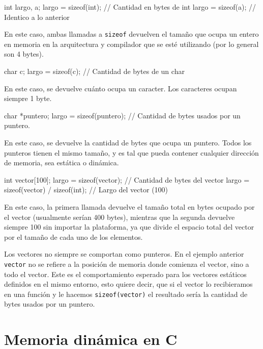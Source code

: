 \begin{codigo-c-plano}
 int largo, a;
 largo = sizeof(int);  // Cantidad en bytes de int
 largo = sizeof(a);    // Identico a lo anterior
\end{codigo-c-plano}

En este caso, ambas llamadas a \lstinline!sizeof! devuelven el tamaño que
ocupa un entero en memoria en la arquitectura y compilador que se esté
utilizando (por lo general son 4 bytes).

\begin{codigo-c-plano}
 char c;
 largo = sizeof(c); // Cantidad de bytes de un char
\end{codigo-c-plano}

En este caso, se devuelve cuánto ocupa un caracter.  Los caracteres ocupan
siempre 1 byte.

\begin{codigo-c-plano}
 char *puntero;
 largo = sizeof(puntero); // Cantidad de bytes usados por un puntero.
\end{codigo-c-plano}

En este caso, se devuelve la cantidad de bytes que ocupa un puntero. Todos los
punteros tienen el mismo tamaño, y es tal que pueda contener cualquier
dirección de memoria, sea estática o dinámica.

\begin{codigo-c-plano}
 int vector[100];
 largo = sizeof(vector);                // Cantidad de bytes del vector
 largo = sizeof(vector) / sizeof(int);  // Largo del vector (100)
\end{codigo-c-plano}

En este caso, la primera llamada devuelve el tamaño total en bytes ocupado por
el vector (usualmente serían 400 bytes), mientras que la segunda devuelve
siempre 100 sin importar la plataforma, ya que divide el espacio total del
vector por el tamaño de cada uno de los elementos.

\begin{atencion}
Los vectores no siempre se comportan como punteros. En el ejemplo anterior
\lstinline!vector! no se refiere a la posición de memoria donde comienza el
vector, sino a todo el vector. Este es el comportamiento esperado para los
vectores estáticos definidos en el mismo entorno, esto quiere decir, que si el
vector lo recibieramos en una función y le hacemos \lstinline!sizeof(vector)!
el resultado sería la cantidad de bytes usados por un puntero.
\end{atencion}

\section{Memoria dinámica en C}

